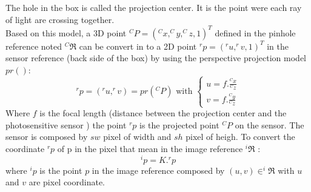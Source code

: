   
 
    
The hole in the box is called the projection center. It is the point were each ray of light are crossing together.  \\
Based on this model, a 3D point $^CP=(^Cx,^Cy,^Cz,1)^T$ defined in the pinhole reference noted $ ^C\Re$ can be convert in to a 2D point  $^rp=(^ru,^rv,1)^T$ in the sensor reference (back side of the box) by using  the perspective projection model $pr() $: 
\begin{equation}
^rp=(^ru,^rv)= pr(^CP) \mbox{ with } \begin{cases} u= f.\frac{^Cx}{^Cz} \\  v= f.\frac{^Cy}{^Cz} 
\end{cases} 
\end{equation}
Where $f$ is the focal length (distance between the projection center and the photosensitive sensor )
the point $^rp$ is the projected point $^CP$ on the sensor. The sensor is composed by $sw$ pixel of width and $sh$  pixel of  heigh. To convert the coordinate $^rp$ of p in the pixel  that mean in the image reference $^i\Re$ : 
\begin{equation}
^ip=K. ^rp
\end{equation}
where $^ip$  is the point $p$ in the image reference composed by $(u,v) \in ^i\Re$ with $u$ and $v$ are  pixel coordinate. 




